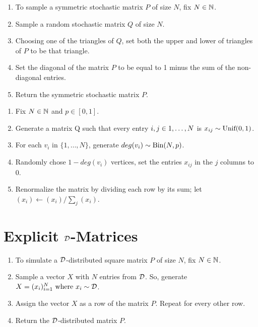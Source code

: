 \begin{algorithm} \hfill
\begin{enumerate}
	\item To sample a symmetric stochastic matrix $P$ of size $N$, fix $N \in \N$.
	\item Sample a random stochastic matrix $Q$ of size $N$.
	\item Choosing one of the triangles of $Q$, set both the upper and lower of triangles of $P$ to be that triangle.
	\item Set the diagonal of the matrix $P$ to be equal to 1 minus the sum of the non-diagonal entries.
	\item Return the symmetric stochastic matrix $P$.
\end{enumerate}
\end{algorithm}


\begin{algorithm} \hfill
\begin{enumerate}
	\item{Fix $N \in \N$ and $p \in [0,1]$}.
	\item{Generate a matrix Q such that every entry $i,j\in \oneto[N]$ is $x_{ij} \sim \Unif(0,1)$.}
	\item{For each $v_i$ in $\{1,\dots,N\}$, generate $deg(v_i) \sim \Bin(N,p)$.}
	\item{Randomly chose $1-deg(v_i)$ vertices, set the entries $x_{ij}$ in the $j$ columns to 0.}
	\item{Renormalize the matrix by dividing each row by its sum; let $(x_i) \leftarrow (x_i)/\sum_j(x_i)$}.
\end{enumerate}
\end{algorithm}


\section{Explicit $\D$-Matrices}

\begin{algorithm} \hfill
\begin{enumerate}
	\item To simulate a $\D$-distributed square matrix $P$ of size $N$, fix $N \in \N$.
	\item Sample a vector $X$ with $N$ entries from $\D$. So, generate $X = (x_i)_{i = 1}^N \where x_i \sim \D$.
	\item Assign the vector $X$ as a row of the matrix $P$. Repeat for every other row.
	\item Return the $\D$-distributed matrix $P$.
\end{enumerate}
\end{algorithm}

\dumitriuALGORITHM

